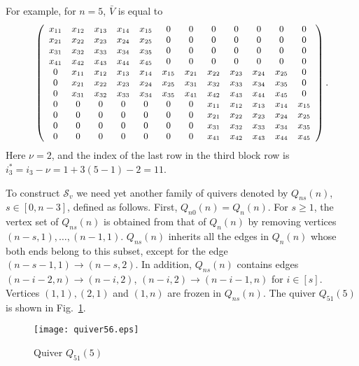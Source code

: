\documentclass{amsart}
\theoremstyle{definition}
\theoremstyle{remark}
\numberwithin{equation}{section}
\numberwithin{theorem}{section}
\begin{document}
For example, for $n=5$,
 $\bar V$ is equal to
 $${\small
\left (
 \begin{array}{ccccccccccccc}
 x_{11} & x_{12} & x_{13} &  x_{14} & x_{15}& 0 & 0 & 0 & 0 & 0 & 0 & 0  \\
  x_{21} & x_{22} & x_{23} & x_{24} & x_{25}& 0 & 0 & 0 & 0 & 0 & 0 & 0 \\
 x_{31} & x_{32} & x_{33} &x_{34} & x_{35}& 0 & 0 & 0 & 0 & 0 & 0 & 0 \\
 x_{41} & x_{42} & x_{43} &x_{44} & x_{45}& 0 & 0 & 0 & 0 & 0 & 0 & 0 \\
   0 & x_{11} & x_{12} & x_{13} & x_{14} & x_{15} &x_{21}& x_{22} & x_{23} &
x_{24} & x_{25}& 0  \\
  0 & x_{21} & x_{22} & x_{23} & x_{24} & x_{25} &x_{31}& x_{32} & x_{33} &
x_{34} & x_{35}& 0  \\
 0 & x_{31} & x_{32} & x_{33} & x_{34} & x_{35} &x_{41}& x_{42} & x_{43} &
x_{44} & x_{45}& 0  \\
 0 & 0 & 0 & 0 & 0 &  0 & 0 & x_{11} & x_{12} & x_{13} & x_{14} & x_{15}  \\
  0 & 0 & 0 & 0 & 0 & 0 & 0 & x_{21} & x_{22} & x_{23} & x_{24} & x_{25} \\
  0 & 0 & 0 & 0 & 0 & 0 & 0 & x_{31} & x_{32} & x_{33} & x_{34} & x_{35}   \\
  0 & 0 & 0 & 0 & 0 & 0 & 0 & x_{41} & x_{42} & x_{43} & x_{44} & x_{45} 
 \end{array}
 \right ).
}
 $$
Here $\nu=2$, and the index of the last row in the third block row is $i^*_3=i_3-\nu=1+3(5-1)-2=11$.

To construct $\mathcal S_v$ we need yet another family of quivers denoted by
$Q_{n s}(n)$, $s\in [0, n-3]$, defined as follows. First, $Q_{n 0}(n)= Q_{n }(n)$. For
$s\geq 1$, the vertex set of $Q_{n s}(n)$ is obtained from that of $Q_{n}(n)$ by
removing vertices $(n-s,1), \ldots, (n-1,1)$. $Q_{n s}(n)$
 inherits all the edges in $Q_{n}(n)$ whose both ends
belong to this subset, except for the edge $(n-s-1,1)\to(n-s,2)$. In addition, $Q_{ns}(n)$  contains edges $(n-i-2,n) \to
(n-i,2)$,
$(n-i,2) \to (n-i-1,n)$ for $i\in [s]$. Vertices $(1,1), (2,1)$ and $(1,n)$ are
frozen in $Q_{ns}(n)$. The quiver $Q_{51}(5)$ is shown in Fig.~\ref{fig:q51(5)}.

\begin{figure}[ht]
\begin{center}
\texttt{[image: quiver56.eps]}
\caption{Quiver $Q_51(5)$}
\label{fig:q51(5)}
\end{center}
\end{figure}
\end{document}
